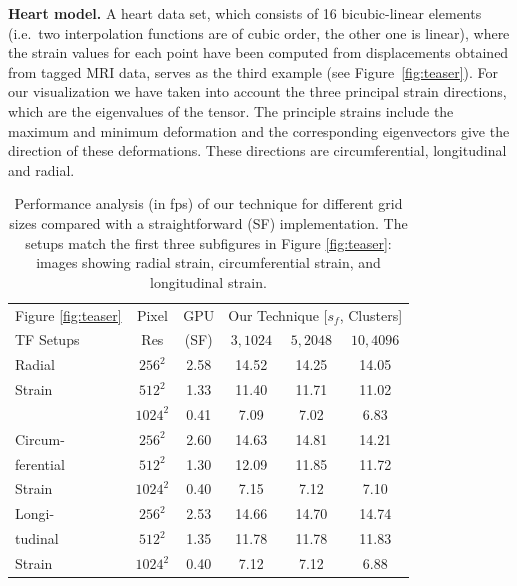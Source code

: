 \documentclass[journal]{vgtc}                %
\begin{document}
\noindent \textbf{Heart model.} A heart data set, which consists of 16 bicubic-linear elements (i.e.~two interpolation functions are of cubic order, the other one is linear),  where the strain values for each point have been computed from displacements  obtained from tagged MRI data, serves as the third example (see Figure~\ref{fig:teaser}). For our visualization we have taken into account the three principal strain directions, which are the eigenvalues of the tensor. The principle strains include the maximum and minimum deformation and the corresponding eigenvectors give the direction of these deformations. These directions are circumferential, longitudinal and radial.
%
\begin{table}[b]
  \caption{Performance analysis (in fps) of our technique for different grid sizes compared with a straightforward (SF) implementation. The setups match the first three subfigures in Figure \ref{fig:teaser}: images showing radial strain, circumferential strain, and longitudinal strain.}
  \label{tab:performance}
  \begin{center}
    \begin{tabular}{|l|c|c|c|c|c|}
      \hline
      Figure \ref{fig:teaser} & Pixel & GPU & \multicolumn{3}{c|}{Our Technique [$s_f$, Clusters]}\\
      TF Setups & Res & (SF) & $3,1024$ & $5,2048$ & $10,4096$ \\
      \hline
      Radial & $256^2$ & 2.58 & 14.52 & 14.25 & 14.05\\
      Strain & $512^2$ & 1.33 & 11.40 & 11.71 & 11.02\\
      & $1024^2$ & 0.41 & 7.09 & 7.02 & 6.83\\
      \hline
      Circum- & $256^2$ & 2.60 & 14.63 & 14.81 & 14.21\\
      ferential & $512^2$ & 1.30 & 12.09 & 11.85 & 11.72\\
      Strain & $1024^2$ & 0.40 & 7.15 & 7.12 & 7.10\\
      \hline
      Longi- & $256^2$ & 2.53 & 14.66 & 14.70 & 14.74\\
      tudinal & $512^2$ & 1.35 & 11.78 & 11.78 & 11.83\\
      Strain & $1024^2$ & 0.40 & 7.12 & 7.12 & 6.88\\
      \hline
    \end{tabular}
  \end{center}
\end{table}
%
\end{document}
